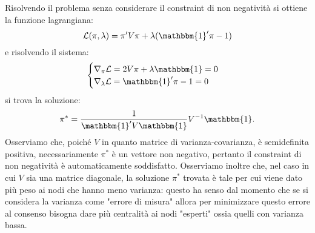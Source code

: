 \begin{alphaparts}
    Risolvendo il problema senza considerare il constraint di non negatività si ottiene la funzione lagrangiana:
    \[\mathcal{L}(\pi, \lambda) = \pi'V\pi + \lambda(\mathbbm{1}'\pi- 1)\]
    e risolvendo il sistema:
    \begin{equation*}
        \begin{cases} \nabla_{\pi} \mathcal{L} = 2V\pi + \lambda \mathbbm{1} = 0 \\
        \nabla_{\lambda} \mathcal{L} = \mathbbm{1}'\pi- 1 = 0\end{cases} 
    \end{equation*}
    si trova la soluzione:
    \begin{equation}
        \pi^* = \frac{1}{\mathbbm{1}'V\mathbbm{1}} V^{- 1} \mathbbm{1}.
    \end{equation}
    Osserviamo che, poiché \(V\) in quanto matrice di varianza-covarianza, è semidefinita positiva, necessariamente \(\pi^*\) è un vettore non negativo, pertanto il constraint di non negatività è automaticamente soddisfatto.
    Osserviamo inoltre che, nel caso in cui \(V\) sia una matrice diagonale, la soluzione \(\pi^*\) trovata è tale per cui viene dato più peso ai nodi che hanno meno varianza: questo ha senso dal momento che se si considera la varianza come "errore di misura" allora per minimizzare questo errore al consenso bisogna dare più centralità ai nodi "esperti" ossia quelli con varianza bassa.

    \questionpart %


\end{alphaparts}
